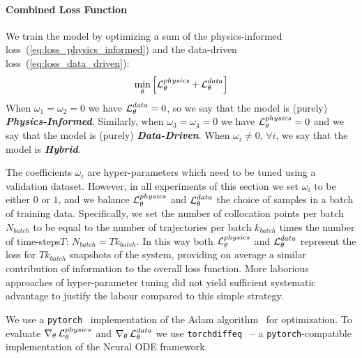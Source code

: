\paragraph{Combined Loss Function} We train the model by optimizing a sum of the physics-informed loss~(\ref{eq:loss_physics_informed}) and the data-driven loss~(\ref{eq:loss_data_driven}):
\begin{equation}
    \label{eq:loss_combined}
    \min_\theta \left[\operatorname{\mathcal{L}}^{physics}_\theta + \operatorname{\mathcal{L}}^{data}_\theta\right]  
\end{equation}
When $\omega_1 = \omega_2 = 0$ we have $\operatorname{\mathcal{L}}^{data}_\theta = 0$, so we say that the model is (purely) \textit{\textbf{Physics-Informed}}. Similarly, when $\omega_3 = \omega_4 = 0$ we have $\operatorname{\mathcal{L}}^{physics}_\theta = 0$ and we say that the model is (purely) \textit{\textbf{Data-Driven}}. When $\omega_i \neq 0, \, \forall i$, we say that the model is \textit{\textbf{Hybrid}}. 

The coefficients $\omega_i$ are hyper-parameters which need to be tuned using a validation dataset. However, in all experiments of this section we set $\omega_i$ to be either $0$ or $1$, and we balance $\operatorname{\mathcal{L}}^{physics}_\theta$ and $\operatorname{\mathcal{L}}^{data}_\theta$ the choice of samples in a batch of training data. Specifically, we set the number of collocation points per batch $N_{batch}$ to be equal to the number of trajectories per batch $k_{batch}$ times the number of time-steps$T$: $N_{batch} = Tk_{batch}$. In this way both $\operatorname{\mathcal{L}}^{physics}_\theta$ and $\operatorname{\mathcal{L}}^{data}_\theta$ represent the loss for $Tk_{batch}$ snapshots of the system, providing on average a similar contribution of information to the overall loss function. More laborious approaches of hyper-parameter tuning did not yield sufficient systematic advantage to justify the labour compared to this simple strategy.

We use a \texttt{pytorch}~\cite{NEURIPS2019_9015} implementation of the Adam algorithm~\cite{kingma2014adam} for optimization. To evaluate $\nabla_\theta \operatorname{\mathcal{L}}^{physics}_\theta$ and $\nabla_\theta \operatorname{\mathcal{L}}^{data}_\theta$ we use \texttt{torchdiffeq}~\cite{chen2018neural} -- a \texttt{pytorch}-compatible implementation of the Neural ODE framework. 

